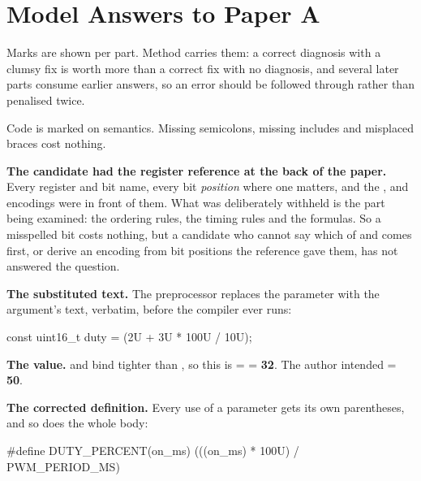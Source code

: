 
\renewcommand{\answerprefix}{ansa}

\chapter{Model Answers to Paper A}
\label{ansa:ch:answers}

Marks are shown per part. Method carries them: a correct diagnosis with a clumsy fix is worth more
than a correct fix with no diagnosis, and several later parts consume earlier answers, so an error
should be followed through rather than penalised twice.

Code is marked on semantics. Missing semicolons, missing includes and misplaced braces cost
nothing.

\textbf{The candidate had the register reference at the back of the paper.} Every register and bit
name, every bit \emph{position} where one matters, and the , 
and  encodings were in front of them. What was deliberately withheld is the part
being examined: the ordering rules, the timing rules and the formulas. So a misspelled bit costs
nothing, but a candidate who cannot say which of  and  comes first, or derive
an encoding from bit positions the reference gave them, has not answered the question.


\textbf{The substituted text.} The preprocessor replaces the parameter with the argument's text,
verbatim, before the compiler ever runs:

\begin{ccode}
const uint16_t duty = (2U + 3U * 100U / 10U);
\end{ccode}

\textbf{The value.} \code{*} and \code{/} bind tighter than \code{+}, so this is
 =  = \textbf{32}. The author intended
 = \textbf{50}. 

\textbf{The corrected definition.} Every use of a parameter gets its own parentheses, and so does
the whole body:

\begin{ccode}
#define DUTY_PERCENT(on_ms) (((on_ms) * 100U) / PWM_PERIOD_MS)
\end{ccode}

